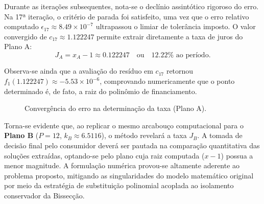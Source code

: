 Durante as iterações subsequentes, nota-se o declínio assintótico rigoroso do erro. Na 17ª iteração, o critério de parada foi satisfeito, uma vez que o erro relativo computado $\epsilon_{17} \approx 8.49 \times 10^{-7}$ ultrapassou o limiar de tolerância imposto. O valor convergido de $c_{17} \approx 1.122247$ permite extrair diretamente a taxa de juros do Plano A:
\begin{equation}
    J_A = x_A - 1 \approx 0.122247 \quad \text{ou} \quad 12.22\% \text{ ao período.}
\end{equation}

Observa-se ainda que a avaliação do resíduo em $c_{17}$ retornou $f_1(1.122247) \approx -5.53 \times 10^{-6}$, comprovando numericamente que o ponto determinado é, de fato, a raiz do polinômio de financiamento.

\begin{figure}[H]
    \centering
    \caption{Convergência do erro na determinação da taxa (Plano A).}
    \label{fig:convergencia_bisseccao_juros}
\end{figure}

Torna-se evidente que, ao replicar o mesmo arcabouço computacional para o \textbf{Plano B} ($P=12$, $k_B \approx 6.5116$), o método revelará a taxa $J_B$. A tomada de decisão final pelo consumidor deverá ser pautada na comparação quantitativa das soluções extraídas, optando-se pelo plano cuja raiz computada ($x-1$) possua a menor magnitude. A formulação numérica provou-se altamente aderente ao problema proposto, mitigando as singularidades do modelo matemático original por meio da estratégia de substituição polinomial acoplada ao isolamento conservador da Bissecção.

